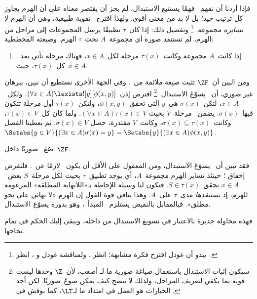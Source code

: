 \documentclass[../../../include/open-logic-section]{subfiles}
\begin{document}
فإذا أردنا أن نفهم~\stagesinex{} فهمًا يستتبع الاستبدال، لم يجز أن
يقتصر معناه على أن الهرم يجاوز كل ترتيب جيد؛ بل لا بد من معنى أقوى.
ولهذا اقترح~\citet{Shoenfield:AST} تقوية طبيعية، وهي أن الهرم لا
\emph{تسايره} مجموعة.
\footnote{يبدو أن غودل اقترح فكرة مشابهة؛ انظر
  \citet[p.~223]{Potter2004}. ولمناقشة غودل و
  \citeauthor{Shoenfield:AST}، انظر~\citet[90--5]{Incurvati2020}.}
وتفصيل ذلك: إذا كان~$\tau$ تطبيقًا يرسل المجموعات إلى مراحل من الهرم،
لم تستنفد صورة أي مجموعة~$A$ تحت~$\tau$ الهرم. وصيغته المخططية:
\begin{enumerate}
	\item[] \stagescofin. إذا كانت~$A$ مجموعة وكانت~$\tau(x)$ مرحلة
	لكل~$x \in A$، فهناك مرحلة تأتي بعد كل~$\tau(x)$، حيث~$x \in A$.
\end{enumerate}
ومن البين أن~$\ZF$ تثبت صيغة ملائمة من~\stagescofin. وفي الجهة
الأخرى نستطيع أن نبين، ببرهان غير صوري، أن~\stagescofin{} يسوّغ
الاستبدال.
\footnote{سيكون إثبات الاستبدال باستعمال صياغة صورية ما لـ
  \stagescofin أصعب، لأن~$\Z$ وحدها ليست قوية بما يكفي لتعريف
  المراحل، ولذلك لا يتضح كيف يمكن صوغ~\stagescofin صوريًا. لكن أحد
  الخيارات هو العمل في امتداد ما لـ$\LT$، كما نوقش في
  .}
افترض إذن~$(\forall x \in A)\lexists![y][\phi(x,y)]$. ولكل~$x \in A$،
لتكن~$\sigma(x)$ هي~$y$ التي تحقق~$\phi(x,y)$، ولتكن~$\tau(x)$ أول
مرحلة تتكون فيها~$\sigma(x)$. يضمن~\stagescofin{} مرحلة~$V$ بحيث
$(\forall x \in A)\tau(x)\in V$. ولما كان كل~$\tau(x) \in V$،
وكانت~$\sigma(x) \subseteq \tau(x)$، وكانت~$V$ مقتدرة، حصل
$\sigma(x) \in V$. ثم يعطينا الفصل
$\Setabs{y \in V}{(\exists x \in A)\sigma(x) = y} =
\Setabs{y}{(\exists x \in A)\phi(x,y)}$.

\begin{prob}
	صُغ~\stagescofin{} صوريًا داخل~$\ZF$.
\end{prob}

فقد تبين أن~\stagescofin{} يسوّغ الاستبدال، ومن المعقول على الأقل أن
يكون~\stagescofin{} لازمًا عن~\stagesinex. فلنفرض إخفاق
\stagescofin؛ حينئذ تساير الهرم مجموعة~$A$، أي يوجد تطبيق~$\tau$
بحيث لكل مرحلة~$S$ بعض~$x \in A$ يحقق~$S \in \tau(x)$. فتكون لنا
وسيلة للإحاطة بـ«اللانهاية المطلقة» المزعومة للهرم، إذ \emph{يستنفدها}
مدى~$\tau$ على~$A$. وهذا ينافي قوة القول إن الهرم «لا نهائي على نحو
مطلق». فبالمقابل بالنقيض يستلزم~\stagesinex{} المبدأ~\stagescofin،
وهو بدوره يسوّغ الاستبدال.

فهذه محاولة جديرة بالاعتبار في تسويغ الاستبدال من داخله، ويبقى إليك
الحكم في تمام نجاحها.
\end{document}
